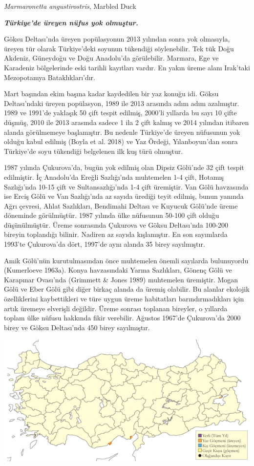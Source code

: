 \documentclass[
  letterpaper,
  DIV=11,
  numbers=noendperiod]{scrreprt}
\begin{document}
\emph{Marmaronetta angustirostris}, Marbled Duck

\textbf{\emph{Türkiye'de üreyen nüfus yok olmuştur.}}

Göksu Deltası'nda üreyen popülasyonun 2013 yılından sonra yok olmasıyla,
üreyen tür olarak Türkiye'deki soyunun tükendiği söylenebilir. Tek tük
Doğu Akdeniz, Güneydoğu ve Doğu Anadolu'da görülebilir. Marmara, Ege ve
Karadeniz bölgelerinde eski tarihli kayıtları vardır. En yakın üreme
alanı Irak'taki Mezopotamya Bataklıkları'dır.

Mart başından ekim başına kadar kaydedilen bir yaz konuğu idi. Göksu
Deltası'ndaki üreyen popülasyon, 1989 ile 2013 arasında adım adım
azalmıştır. 1989 ve 1991'de yaklaşık 50 çift tespit edilmiş, 2000'li
yıllarda bu sayı 10 çifte düşmüş, 2010 ile 2013 arasında sadece 1 ila 2
çift kalmış ve 2014 yılından itibaren alanda görülmemeye başlamıştır. Bu
nedenle Türkiye'de üreyen nüfusunun yok olduğu kabul edilmiş (Boyla et
al. 2018) ve Yaz Ördeği, Yılanboyun'dan sonra Türkiye'de soyu tükendiği
belgelenen ilk kuş türü olmuştur.

1987 yılında Çukurova'da, bugün yok edilmiş olan Dipsiz Gölü'nde 32 çift
tespit edilmiştir. İç Anadolu'da Ereğli Sazlığı'nda muhtemelen 1-4 çift,
Hotamış Sazlığı'nda 10-15 çift ve Sultansazlığı'nda 1-4 çift üremiştir.
Van Gölü havzasında ise Erciş Gölü ve Van Sazlığı'nda az sayıda ürediği
teyit edilmiş, bunun yanında Ağrı çevresi, Ahlat Sazlıkları, Bendimahi
Deltası ve Kuyucuk Gölü'nde üreme döneminde görülmüştür. 1987 yılında
ülke nüfusunun 50-100 çift olduğu düşünülmüştür. Üreme sonrasında
Çukurova ve Göksu Deltası'nda 100-200 bireyin toplandığı bilinir.
Nadiren az sayıda kışlamıştır. En son sayımlarda 1993'te Çukurova'da
dört, 1997'de aynı alanda 35 birey sayılmıştır.

Amik Gölü'nün kurutulmasından önce muhtemelen önemli sayılarda
bulunuyordu (Kumerloeve 1963a). Konya havzasındaki Yarma Sazlıkları,
Gönenç Gölü ve Karapınar Ovası'nda (Grimmett \& Jones 1989) muhtemelen
üremiştir. Mogan Gölü ve Eber Gölü gibi diğer birkaç alanda da üremiş
olabilir. Bu alanlar ekolojik özelliklerini kaybettikleri ve türe uygun
üreme habitatları barındırmadıkları için artık üremeye elverişli
değildir. Üreme sonrası toplanan bireyler, o yıllarda toplam ülke nüfusu
hakkında fikir verebilir. Ağustos 1967'de Çukurova'da 2000 birey ve
Göksu Deltası'nda 450 birey sayılmıştır.

\includegraphics{images/harita_Page_021.png}
\end{document}
